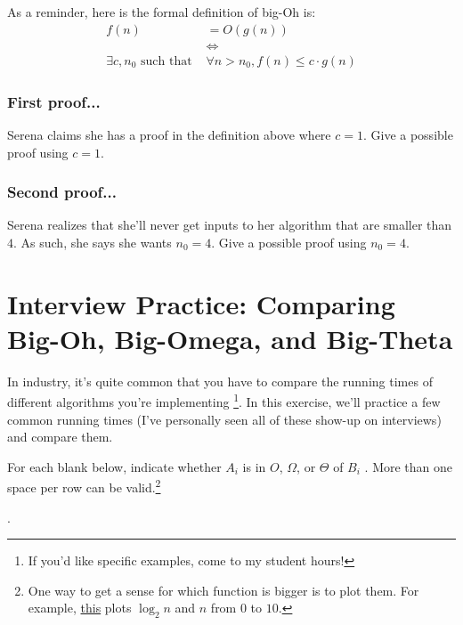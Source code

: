 \documentclass [12pt]{article}
\begin{document}
As a reminder, here is the formal definition of big-Oh is:
\begin{align*}
f(n) &= O(g(n)) \\
&\iff \\
\exists c, n_0 \text{ such that } &\forall n > n_0, f(n) \leq c \cdot g(n)
\end{align*}


\subsubsection{First proof...}
 Serena claims she has a proof in the definition above where $c = 1$. Give a possible proof using $c=1$.

\subsubsection{Second proof...}
 Serena realizes that she'll never get inputs to her algorithm that are smaller than $4$. As such, she says she wants $n_0 = 4$. Give a possible proof using $n_0 = 4$.



\pagebreak
\section{Interview Practice: Comparing Big-Oh, Big-Omega, and Big-Theta}
 In industry, it's quite common that you have to compare the running times of different algorithms you're implementing \footnote{If you'd like specific examples, come to my student hours!}. In this exercise, we'll practice a few common running times (I've personally seen all of these show-up on interviews) and compare them.

For each blank below, indicate whether $A_i$ is in $O$, $\Omega$, or $\Theta$ of $B_i$
. More than one space per row can be valid.\footnote{One way to get a sense for which function is bigger is to plot them. For example, \href{https://www.wolframalpha.com/input/?i=plot+log_2+n+and+n+from+0+to+10}{this} plots $\log_2 n$ and $n$ from $0$ to $10$.}

.
\end{document}
